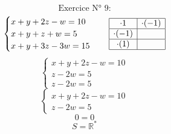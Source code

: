\documentclass{article}
\begin{document}
\[
\text{Exercice N° 9:}
\]
\[
\begin{cases}
x+y+2z-w=10 \\
x+y+z+w=5 \\
x+y+3z-3w=15
\end{cases}
\quad
\begin{array}{|c|c|}
\hline
\cdot 1 & \cdot (-1) \\
\hline
\cdot (-1) & \\
\hline
\cdot (1) & \\
\hline
\end{array}
\]
\[
\begin{cases}
x+y+2z-w=10 \\
z-2w=5 \\
z-2w=5
\end{cases}
\]
\[
\begin{cases}
x+y+2z-w=10 \\
z-2w=5
\end{cases}
\]
\[
0=0
\]
\[
S = \mathbb{R}^*
\]
\end{document}
